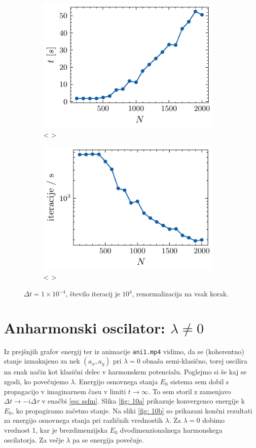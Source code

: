\documentclass[11pt]{report}
\begin{document}
\begin{figure}[h!]
	\centering
	\begin{subfigure}[b]{0.49\textwidth}
		\centering
		\includegraphics{gpu_ssfm_times.pdf}
		\caption{< >}
		\label{fig: < >}
	\end{subfigure}
	\hfill
	\begin{subfigure}[b]{0.49\textwidth}
		\centering
		\includegraphics{gpu_ssfm_iter.pdf}
		\caption{< >}
		\label{fig: < >}
	\end{subfigure}
	\caption{$\Delta t=1\times 10^{-4}$, število iteracij je $10^4$, renormalizacija na vsak korak.}
	\label{fig: 9}
\end{figure}

\newpage

\section{Anharmonski oscilator: $\lambda \neq 0$}
Iz prejšnjih grafov energij ter iz animacije \texttt{ani1.mp4} vidimo, da se (koherentno) stanje izmaknjeno za nek $(a_x, a_y)$
pri $\lambda=0$ obnaša semi-klasično, torej oscilira na enak način kot klasični delec v harmonskem potencialu.
Poglejmo si še kaj se zgodi, ko povečujemo $\lambda$.
Energijo osnovnega stanja $E_0$ sistema sem dobil s propagacijo v imaginarnem času v limiti $t\rightarrow \infty$.
To sem storil z zamenjavo $\Delta t \rightarrow -i \Delta \tau$ v enačbi \ref{eq: ssfm}.
Slika \ref{fig: 10a} prikazuje konvergenco energije k $E_0$, ko propagiramo začetno stanje.
Na sliki \ref{fig: 10b} so prikazani končni rezultati za energijo osnovnega stanja pri različnih vrednostih $\lambda$.
Za $\lambda=0$ dobimo vrednost 1, kar je brezdimenzijska $E_0$ dvodimenzionalnega harmonskega oscilatorja.
Za večje $\lambda$ pa se energija povečuje.
\end{document}
